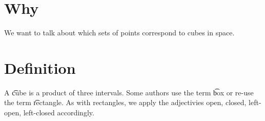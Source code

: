 
\section*{Why}

We want to talk about which sets of points correspond to cubes in space.

\section*{Definition}

A \t{cube} is a product of three intervals.
Some authors use the term \t{box} or re-use the term \t{rectangle}.
As with rectangles, we apply the adjectivies open, closed, left-open, left-closed accordingly.

\blankpage
